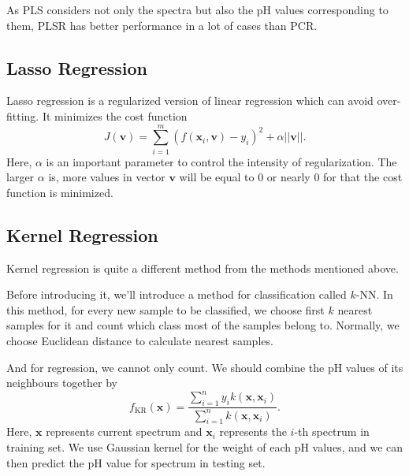 \documentclass[a4paper]{article}
\newcommand{\bfv}{\mathbf{v}}
\newcommand{\bfx}{\mathbf{x}}
\begin{document}
As PLS considers not only the spectra but also the pH values corresponding to them, PLSR has better performance in a lot of cases than PCR.
\subsection{Lasso Regression}
Lasso regression \cite{tibshirani1996regression} is a regularized version of linear regression which can avoid over-fitting. It minimizes the cost function
\begin{equation}
J(\bfv)=\sum_{i=1}^m (f(\bfx_i,\bfv)-y_i)^2+\alpha ||\bfv||.
\end{equation}
Here, $\alpha$ is an important parameter to control the intensity of regularization. The larger $\alpha$ is, more values in vector $\bfv$ will be equal to 0 or nearly 0 for that the cost function is minimized.
\subsection{Kernel Regression}
Kernel regression \cite{nadaraya1964estimating} is quite a different method from the methods mentioned above.

Before introducing it, we'll introduce a method for classification called $k$-NN. In this method, for every new sample to be classified, we choose first $k$ nearest samples for it and count which class most of the samples belong to. Normally, we choose Euclidean distance to calculate nearest samples.

And for regression, we cannot only count. We should combine the pH values of its neighbours together by
\begin{equation}
f_{\mathrm{KR}}(\bfx) = \frac{\displaystyle \sum_{i=1}^n y_ik(\bfx,\bfx_i)}{\displaystyle \sum_{i=1}^n k(\bfx,\bfx_i)}.
\end{equation}
Here, $\bfx$ represents current spectrum and $\bfx_i$ represents the $i$-th spectrum in training set. We use Gaussian kernel for the weight of each pH values, and we can then predict the pH value for spectrum in testing set.

 
\end{document}

